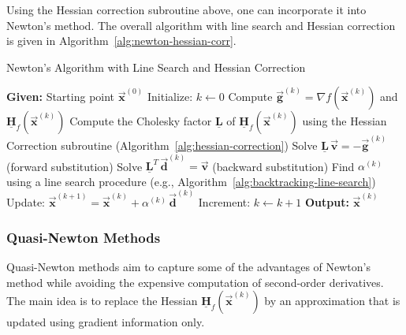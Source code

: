 \documentclass[9pt, headings=standardclasses, parskip=half]{scrartcl}
\newcommand{\matr}[1]{\underline{\boldsymbol{#1}}}
\newcommand{\vect}[1]{\vec{\boldsymbol{#1}}}
\begin{document}
Using the Hessian correction subroutine above, one can incorporate it into Newton's method. The overall algorithm with line search and Hessian correction is given in Algorithm~\ref{alg:newton-hessian-corr}.

\begin{algorithm}[h]
\caption{Newton's Algorithm with Line Search and Hessian Correction}\label{alg:newton-hessian-corr}
\begin{algorithmic}[1]
    \State \textbf{Given:} Starting point \(\vect{x}^{(0)}\)
    \State Initialize: \(k \leftarrow 0\)
    \While{\(\|\nabla f(\vect{x}^{(k)})\| > \epsilon\) and \(k \le k_{\max}\)}
        \State Compute \(\vect{g}^{(k)} = \nabla f(\vect{x}^{(k)})\) and \(\matr{H}_{f}(\vect{x}^{(k)})\)
        \State Compute the Cholesky factor \(\matr{L}\) of \(\matr{H}_{f}(\vect{x}^{(k)})\) using the Hessian Correction subroutine (Algorithm~\ref{alg:hessian-correction})
        \State Solve \(\matr{L}\,\vect{v} = -\vect{g}^{(k)}\) (forward substitution) 
        \State Solve \(\matr{L}^T\,\vect{d}^{(k)} = \vect{v}\) (backward substitution) 
        \State Find \(\alpha^{(k)}\) using a line search procedure (e.g., Algorithm~\ref{alg:backtracking-line-search})
        \State Update: \(\vect{x}^{(k+1)} = \vect{x}^{(k)} + \alpha^{(k)}\,\vect{d}^{(k)}\) 
        \State Increment: \(k \leftarrow k + 1\)
    \EndWhile
    \State \textbf{Output:} \(\vect{x}^{(k)}\) %
\end{algorithmic}
\end{algorithm}


\subsubsection{Quasi-Newton Methods}

Quasi-Newton methods aim to capture some of the advantages of Newton's method while avoiding the expensive computation of second-order derivatives. The main idea is to replace the Hessian \(\matr{H}_{f}(\vect{x}^{(k)})\) by an approximation that is updated using gradient information only.
\end{document}
